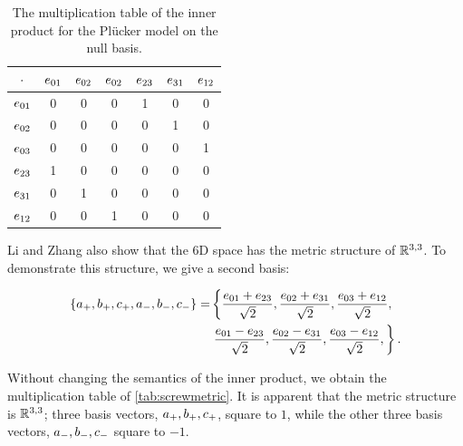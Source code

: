 \begin{table}[t]
  \caption{The multiplication table of the inner product for the Pl\"ucker model on the null basis.}
  \label{tab:nullmetric}
  \begin{center}
    \begin{tabular}{|c||c|c|c|c|c|c|}
      \hline
      $\mathbin{\cdot}$ & $e_{01}$ & $e_{02}$ & $e_{02}$ & $e_{23}$ & $e_{31}$ & $e_{12}$ \\
      \hline \hline
      $e_{01}$ & 0 & 0 & 0 & 1 & 0 & 0 \\
      \hline
      $e_{02}$ & 0 & 0 & 0 & 0 & 1 & 0 \\
      \hline
      $e_{03}$ & 0 & 0 & 0 & 0 & 0 & 1 \\
      \hline
      $e_{23}$ & 1 & 0 & 0 & 0 & 0 & 0 \\
      \hline
      $e_{31}$ & 0 & 1 & 0 & 0 & 0 & 0 \\
      \hline
      $e_{12}$ & 0 & 0 & 1 & 0 & 0 & 0 \\
      \hline
    \end{tabular}
  \end{center}
\end{table}

Li and Zhang also show that the 6D space has the metric structure of $\mathbb{R}^{3,3}$.  To demonstrate this structure, we give a second basis:

\begin{equation*}
  \begin{split}
  \left\{a_{+}, b_{+}, c_{+}, a_{-}, b_{-}, c_{-}\right\} =
    & \left\{ \frac{e_{01} + e_{23}}{\sqrt{2}}, \frac{e_{02} + e_{31}}{\sqrt{2}}, \frac{e_{03} + e_{12}}{\sqrt{2}}, \right.\\
    & \left.  \frac{e_{01} - e_{23}}{\sqrt{2}}, \frac{e_{02} - e_{31}}{\sqrt{2}}, \frac{e_{03} - e_{12}}{\sqrt{2}}, \right\}
.
\end{split}
\end{equation*}

Without changing the semantics of the inner product, we obtain the multiplication table of \autoref{tab:screwmetric}.  It is apparent that the metric structure is $\mathbb{R}^{3,3}$; three basis vectors, $a_{+}, b_{+}, c_{+}$, square to $1$, while the other three basis vectors, $a_{-}, b_{-}, c_{-}$ square to $-1$.  

